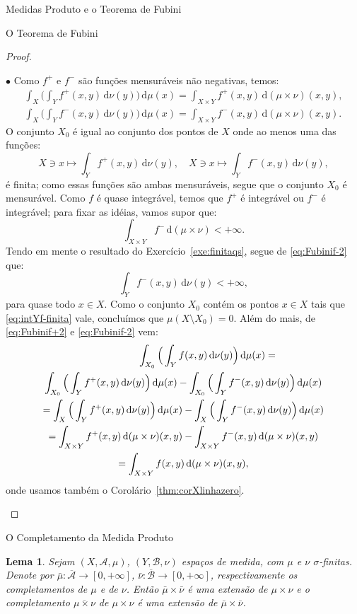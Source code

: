 \documentclass[oneside,final,11pt]{amsbook}
\newcommand{\dd}{\mathrm d}
\newcounter{contador}
\newenvironment{bulletindent}{\setcounter{contador}{0}
\begin{list} {$\bullet$}
{\usecounter{contador}
\setlength{\leftmargin}{10pt}
\setlength{\rightmargin}{10pt}
\setlength{\labelsep}{5pt}
\setlength{\itemsep}{10pt}
\setlength{\topsep}{10pt}}}
{\end{list}}
\theoremstyle{remark}\newtheorem{exercise}{Exercício}[chapter]
\theoremstyle{remark}\newtheorem{*exercise}[exercise]{\hbox to 0pt{\hskip 0pt minus 1fil*}Exercício}
\theoremstyle{definition}\newtheorem{exdefin}{Definição}[chapter]
\theoremstyle{plain}\newtheorem{teo}{Teorema}[section]
\theoremstyle{plain}\newtheorem{lem}[teo]{Lema}
\theoremstyle{plain}\newtheorem{prop}[teo]{Proposição}
\theoremstyle{plain}\newtheorem{cor}[teo]{Corolário}
\theoremstyle{definition}\newtheorem{defin}[teo]{Definição}
\theoremstyle{remark}\newtheorem{rem}[teo]{Observação}
\theoremstyle{definition}\newtheorem{notation}[teo]{Notação}
\theoremstyle{definition}\newtheorem{convention}[teo]{Convenção}
\theoremstyle{definition}\newtheorem{example}[teo]{Exemplo}
\numberwithin{section}{chapter}
\numberwithin{equation}{section}
\begin{document}
\begin{chapter}{Medidas Produto e o Teorema de Fubini}
\begin{section}{O Teorema de Fubini}
\begin{proof}
\begin{bulletindent}
Como $f^+$ e $f^-$ são funções mensuráveis não negativas, temos:
\begin{gather}
\int_X\Big(\int_Yf^+(x,y)\,\dd\nu(y)\Big)\,\dd\mu(x)=\int_{X\times Y}f^+(x,y)\,\dd(\mu\times\nu)(x,y),\label{eq:Fubinif+2}\\
\int_X\Big(\int_Yf^-(x,y)\,\dd\nu(y)\Big)\,\dd\mu(x)=\int_{X\times Y}f^-(x,y)\,\dd(\mu\times\nu)(x,y).\label{eq:Fubinif-2}
\end{gather}
O conjunto $X_0$ é igual ao conjunto dos pontos de $X$ onde ao menos uma das funções:
\[X\ni x\longmapsto\int_Yf^+(x,y)\,\dd\nu(y),\quad
X\ni x\longmapsto\int_Yf^-(x,y)\,\dd\nu(y),\]
é finita; como essas funções são ambas mensuráveis, segue que o conjunto $X_0$ é mensurável.
Como $f$ é quase integrável, temos que $f^+$ é integrável ou $f^-$ é integrável;
para fixar as idéias, vamos supor que:
\[\int_{X\times Y}f^-\,\dd(\mu\times\nu)<+\infty.\]
Tendo em mente o resultado do Exercício~\ref{exe:finitaqs}, segue de \eqref{eq:Fubinif-2} que:
\begin{equation}\label{eq:intYf-finita}
\int_Yf^-(x,y)\,\dd\nu(y)<+\infty,
\end{equation}
para quase todo $x\in X$. Como o conjunto $X_0$ contém os pontos $x\in X$ tais que
\eqref{eq:intYf-finita} vale, concluímos que $\mu(X\setminus X_0)=0$. Além do mais,
de \eqref{eq:Fubinif+2} e \eqref{eq:Fubinif-2} vem:
\begin{multline*}
\hfil\int_{X_0}\Big(\int_Yf(x,y)\,\dd\nu(y)\Big)\,\dd\mu(x)=\\
\int_{X_0}\Big(\int_Yf^+(x,y)\,\dd\nu(y)\Big)\,\dd\mu(x)
-\int_{X_0}\Big(\int_Yf^-(x,y)\,\dd\nu(y)\Big)\,\dd\mu(x)\\
=\int_X\Big(\int_Yf^+(x,y)\,\dd\nu(y)\Big)\,\dd\mu(x)
-\int_X\Big(\int_Yf^-(x,y)\,\dd\nu(y)\Big)\,\dd\mu(x)\\
=\int_{X\times Y}f^+(x,y)\,\dd(\mu\times\nu)(x,y)-\int_{X\times Y}f^-(x,y)\,\dd(\mu\times\nu)(x,y)\\
=\int_{X\times Y}f(x,y)\,\dd(\mu\times\nu)(x,y),
\end{multline*}
onde usamos também o Corolário~\ref{thm:corXlinhazero}.\qedhere
\end{bulletindent}
\end{proof}

\end{section}

\begin{section}{O Completamento da Medida Produto}
\label{sec:complFubini}

\begin{lem}\label{thm:prodcomplet}
Sejam $(X,\mathcal A,\mu)$, $(Y,\mathcal B,\nu)$ espaços de medida, com $\mu$ e $\nu$
$\sigma$-finitas. Denote por $\bar\mu:\overline{\mathcal A}\to[0,+\infty]$,
$\bar\nu:\overline{\mathcal B}\to[0,+\infty]$, respectivamente os completamentos
de $\mu$ e de $\nu$. Então $\bar\mu\times\bar\nu$ é uma extensão de $\mu\times\nu$
e o completamento $\overline{\mu\times\nu}$ de $\mu\times\nu$ é uma extensão
de $\bar\mu\times\bar\nu$.
\end{lem}


\end{section}
\end{chapter}
\end{document}
